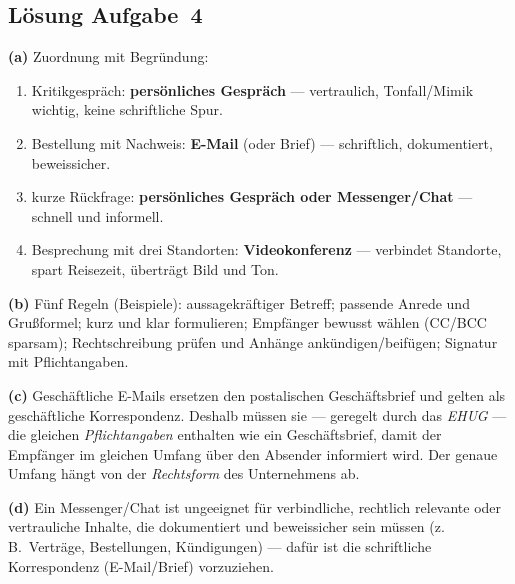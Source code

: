 \documentclass[11pt, a4paper]{article}
\begin{document}
\subsection*{Lösung Aufgabe~4}
\begin{loesung}
\textbf{(a)} Zuordnung mit Begründung:
\begin{enumerate}[label=\arabic*., itemsep=0pt]
  \item Kritikgespräch: \textbf{persönliches Gespräch} --- vertraulich, Tonfall/Mimik
    wichtig, keine schriftliche Spur.
  \item Bestellung mit Nachweis: \textbf{E-Mail} (oder Brief) --- schriftlich,
    dokumentiert, beweissicher.
  \item kurze Rückfrage: \textbf{persönliches Gespräch oder Messenger/Chat} --- schnell und
    informell.
  \item Besprechung mit drei Standorten: \textbf{Videokonferenz} --- verbindet Standorte,
    spart Reisezeit, überträgt Bild und Ton.
\end{enumerate}

\textbf{(b)} Fünf Regeln (Beispiele): aussagekräftiger Betreff; passende Anrede und
Grußformel; kurz und klar formulieren; Empfänger bewusst wählen (CC/BCC sparsam);
Rechtschreibung prüfen und Anhänge ankündigen/beifügen; Signatur mit Pflichtangaben.

\textbf{(c)} Geschäftliche E-Mails ersetzen den postalischen Geschäftsbrief und gelten als
geschäftliche Korrespondenz. Deshalb müssen sie --- geregelt durch das \emph{EHUG} --- die
gleichen \emph{Pflichtangaben} enthalten wie ein Geschäftsbrief, damit der Empfänger im
gleichen Umfang über den Absender informiert wird. Der genaue Umfang hängt von der
\emph{Rechtsform} des Unternehmens ab.

\textbf{(d)} Ein Messenger/Chat ist ungeeignet für verbindliche, rechtlich relevante oder
vertrauliche Inhalte, die dokumentiert und beweissicher sein müssen (z.\,B.\ Verträge,
Bestellungen, Kündigungen) --- dafür ist die schriftliche Korrespondenz (E-Mail/Brief)
vorzuziehen.
\end{loesung}
\end{document}
